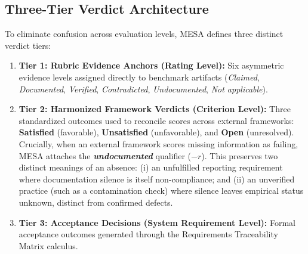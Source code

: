 \documentclass[runningheads]{llncs}
\begin{document}
\subsection{Three-Tier Verdict Architecture}
To eliminate confusion across evaluation levels, MESA defines three distinct verdict tiers:
\begin{enumerate}[leftmargin=*]
    \item \textbf{Tier 1: Rubric Evidence Anchors (Rating Level):} Six asymmetric evidence levels assigned directly to benchmark artifacts (\emph{Claimed}, \emph{Documented}, \emph{Verified}, \emph{Contradicted}, \emph{Undocumented}, \emph{Not applicable}).
    \item \textbf{Tier 2: Harmonized Framework Verdicts (Criterion Level):} Three standardized outcomes used to reconcile scores across external frameworks: \textbf{Satisfied} (favorable), \textbf{Unsatisfied} (unfavorable), and \textbf{Open} (unresolved). Crucially, when an external framework scores missing information as failing, MESA attaches the \textbf{\emph{undocumented}} qualifier ($-r$). This preserves two distinct meanings of an absence: (i) an unfulfilled reporting requirement where documentation silence is itself non-compliance; and (ii) an unverified practice (such as a contamination check) where silence leaves empirical status unknown, distinct from confirmed defects.
    \item \textbf{Tier 3: Acceptance Decisions (System Requirement Level):} Formal acceptance outcomes generated through the Requirements Traceability Matrix calculus.
\end{enumerate}
\end{document}
